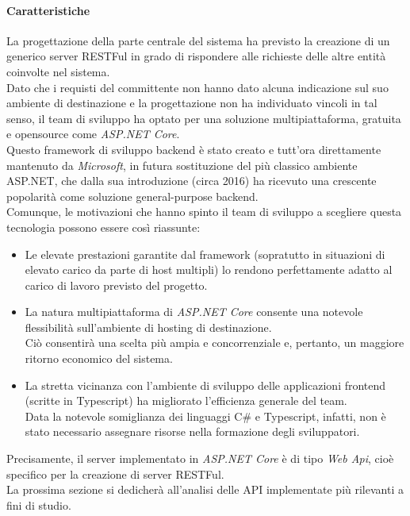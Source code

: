\documentclass[12pt]{article}
\begin{document}
\paragraph{Caratteristiche}
La progettazione della parte centrale del sistema ha previsto la creazione di un generico server RESTFul in grado di rispondere alle richieste delle altre entità coinvolte nel sistema.\\
Dato che i requisti del committente non hanno dato alcuna indicazione sul suo ambiente di destinazione e la progettazione non ha individuato vincoli in tal senso, il team di sviluppo ha optato per una soluzione multipiattaforma, gratuita e opensource come \textit{ASP.NET Core}.\\
Questo framework di sviluppo backend è stato creato e tutt'ora direttamente mantenuto da \textit{Microsoft}, in futura sostituzione del più classico ambiente ASP.NET, che dalla sua introduzione (circa 2016) ha ricevuto una crescente popolarità come soluzione general-purpose backend.\\
Comunque, le motivazioni che hanno spinto il team di sviluppo a scegliere questa tecnologia possono essere così riassunte: 
\begin{itemize}
\item Le elevate prestazioni garantite dal framework (sopratutto in situazioni di elevato carico da parte di host multipli) lo rendono perfettamente adatto al carico di lavoro previsto del progetto.
\item La natura multipiattaforma di \textit{ASP.NET Core} consente una notevole flessibilità sull'ambiente di hosting di destinazione.\\
Ciò consentirà una scelta più ampia e concorrenziale e, pertanto, un maggiore ritorno economico del sistema.
\item La stretta vicinanza con l'ambiente di sviluppo delle applicazioni frontend (scritte in Typescript) ha migliorato l'efficienza generale del team.\\
Data la notevole somiglianza dei linguaggi C\# e Typescript, infatti, non è stato necessario assegnare risorse nella formazione degli sviluppatori.
\end{itemize}
Precisamente, il server implementato in \textit{ASP.NET Core} è di tipo \textit{Web Api}, cioè specifico per la creazione di server RESTFul.\\
La prossima sezione si dedicherà all'analisi delle API implementate più rilevanti a fini di studio.
\end{document}
